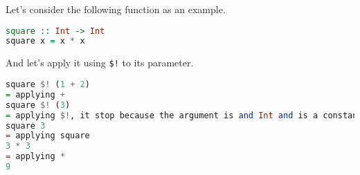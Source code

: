 Let's consider the following function as an example.

\begin{lstlisting}[language=haskell]
square :: Int -> Int
square x = x * x
\end{lstlisting}

And let's apply it using \texttt{\$!} to its parameter.

\begin{lstlisting}[language=haskell]
square $! (1 + 2)
= applying +
square $! (3)
= applying $!, it stop because the argument is and Int and is a constant value
square 3
= applying square
3 * 3
= applying *
9
\end{lstlisting}